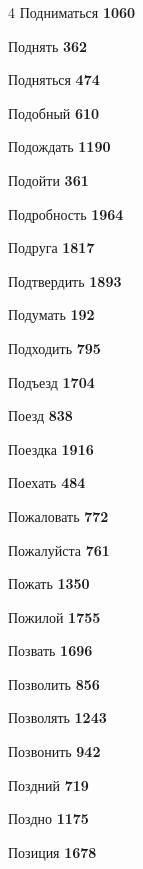 \begin{multicols}{4}
\noindent Подниматься \dotfill \textbf{\color{secondary} 1060}\par
\noindent Поднять \dotfill \textbf{\color{secondary} 362}\par
\noindent Подняться \dotfill \textbf{\color{secondary} 474}\par
\noindent Подобный \dotfill \textbf{\color{secondary} 610}\par
\noindent Подождать \dotfill \textbf{\color{secondary} 1190}\par
\noindent Подойти \dotfill \textbf{\color{secondary} 361}\par
\noindent Подробность \dotfill \textbf{\color{secondary} 1964}\par
\noindent Подруга \dotfill \textbf{\color{secondary} 1817}\par
\noindent Подтвердить \dotfill \textbf{\color{secondary} 1893}\par
\noindent Подумать \dotfill \textbf{\color{secondary} 192}\par
\noindent Подходить \dotfill \textbf{\color{secondary} 795}\par
\noindent Подъезд \dotfill \textbf{\color{secondary} 1704}\par
\noindent Поезд \dotfill \textbf{\color{secondary} 838}\par
\noindent Поездка \dotfill \textbf{\color{secondary} 1916}\par
\noindent Поехать \dotfill \textbf{\color{secondary} 484}\par
\noindent Пожаловать \dotfill \textbf{\color{secondary} 772}\par
\noindent Пожалуйста \dotfill \textbf{\color{secondary} 761}\par
\noindent Пожать \dotfill \textbf{\color{secondary} 1350}\par
\noindent Пожилой \dotfill \textbf{\color{secondary} 1755}\par
\noindent Позвать \dotfill \textbf{\color{secondary} 1696}\par
\noindent Позволить \dotfill \textbf{\color{secondary} 856}\par
\noindent Позволять \dotfill \textbf{\color{secondary} 1243}\par
\noindent Позвонить \dotfill \textbf{\color{secondary} 942}\par
\noindent Поздний \dotfill \textbf{\color{secondary} 719}\par
\noindent Поздно \dotfill \textbf{\color{secondary} 1175}\par
\noindent Позиция \dotfill \textbf{\color{secondary} 1678}\par

\end{multicols}
